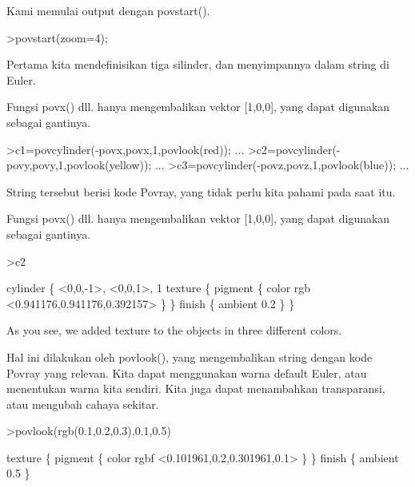 \documentclass[12pt,arial,letterpaper]{book}
\begin{document}
\begin{eulercomment}
\begin{eulercomment}
\begin{eulercomment}
\begin{eulercomment}
\begin{eulercomment}
\begin{eulercomment}
\begin{eulercomment}
\begin{eulercomment}
\begin{eulercomment}
\begin{eulercomment}
\begin{eulercomment}
\begin{eulercomment}
\begin{eulercomment}
\begin{eulercomment}
\begin{eulercomment}
\begin{eulercomment}
\begin{eulercomment}
\begin{eulercomment}
\begin{eulercomment}
Kami memulai output dengan povstart().
\end{eulercomment}
\begin{eulerprompt}
>povstart(zoom=4);
\end{eulerprompt}
\begin{eulercomment}
Pertama kita mendefinisikan tiga silinder, dan menyimpannya dalam
string di Euler.

Fungsi povx() dll. hanya mengembalikan vektor [1,0,0], yang dapat
digunakan sebagai gantinya.
\end{eulercomment}
\begin{eulerprompt}
>c1=povcylinder(-povx,povx,1,povlook(red)); ...
>c2=povcylinder(-povy,povy,1,povlook(yellow)); ...
>c3=povcylinder(-povz,povz,1,povlook(blue)); ...
\end{eulerprompt}
\begin{eulercomment}
String tersebut berisi kode Povray, yang tidak perlu kita pahami pada
saat itu.

Fungsi povx() dll. hanya mengembalikan vektor [1,0,0], yang dapat
digunakan sebagai gantinya.
\end{eulercomment}
\begin{eulerprompt}
>c2
\end{eulerprompt}
\begin{euleroutput}
  cylinder \{ <0,0,-1>, <0,0,1>, 1
   texture \{ pigment \{ color rgb <0.941176,0.941176,0.392157> \}  \} 
   finish \{ ambient 0.2 \} 
   \}
\end{euleroutput}
\begin{eulercomment}
As you see, we added texture to the objects in three different colors.

Hal ini dilakukan oleh povlook(), yang mengembalikan string dengan
kode Povray yang relevan. Kita dapat menggunakan warna default Euler,
atau menentukan warna kita sendiri. Kita juga dapat menambahkan
transparansi, atau mengubah cahaya sekitar.
\end{eulercomment}
\begin{eulerprompt}
>povlook(rgb(0.1,0.2,0.3),0.1,0.5)
\end{eulerprompt}
\begin{euleroutput}
   texture \{ pigment \{ color rgbf <0.101961,0.2,0.301961,0.1> \}  \} 
   finish \{ ambient 0.5 \} 
  

\end{euleroutput}
\end{eulercomment}
\end{eulercomment}
\end{eulercomment}
\end{eulercomment}
\end{eulercomment}
\end{eulercomment}
\end{eulercomment}
\end{eulercomment}
\end{eulercomment}
\end{eulercomment}
\end{eulercomment}
\end{eulercomment}
\end{eulercomment}
\end{eulercomment}
\end{eulercomment}
\end{eulercomment}
\end{eulercomment}
\end{eulercomment}
\end{document}
